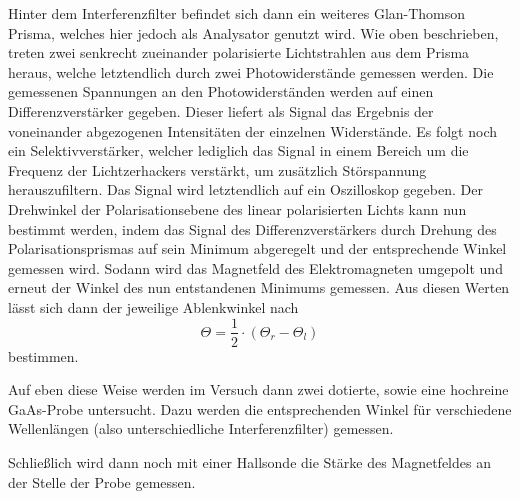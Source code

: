 Hinter dem Interferenzfilter befindet sich dann ein weiteres Glan-Thomson Prisma,
welches hier jedoch als Analysator genutzt wird. Wie oben beschrieben, treten zwei
senkrecht zueinander polarisierte Lichtstrahlen aus dem Prisma heraus, welche letztendlich
durch zwei Photowiderstände gemessen werden. Die gemessenen Spannungen an den Photowiderständen
werden auf einen Differenzverstärker gegeben. Dieser liefert als Signal das Ergebnis der voneinander
abgezogenen Intensitäten der einzelnen Widerstände. Es folgt noch ein Selektivverstärker, welcher
lediglich das Signal in einem Bereich um die Frequenz der Lichtzerhackers verstärkt, um
zusätzlich Störspannung herauszufiltern. Das Signal wird letztendlich auf
ein Oszilloskop gegeben. Der Drehwinkel der Polarisationsebene des linear polarisierten Lichts
kann nun bestimmt werden, indem das Signal des Differenzverstärkers durch Drehung des
Polarisationsprismas auf sein Minimum abgeregelt und der entsprechende Winkel gemessen
wird. Sodann wird das Magnetfeld des Elektromagneten umgepolt und erneut der
Winkel des nun entstandenen Minimums gemessen. Aus diesen Werten lässt sich dann der
jeweilige Ablenkwinkel nach
\begin{equation}
  \Theta  = \frac{1}{2} \cdot (\Theta_r - \Theta_l)
\label{eqn:drehwinkel}
\end{equation}
bestimmen.

Auf eben diese Weise werden im Versuch dann zwei dotierte, sowie eine hochreine
GaAs-Probe untersucht. Dazu werden die entsprechenden Winkel für verschiedene
Wellenlängen (also unterschiedliche Interferenzfilter) gemessen.

Schließlich wird dann noch mit einer Hallsonde die Stärke des Magnetfeldes an der
Stelle der Probe gemessen.
